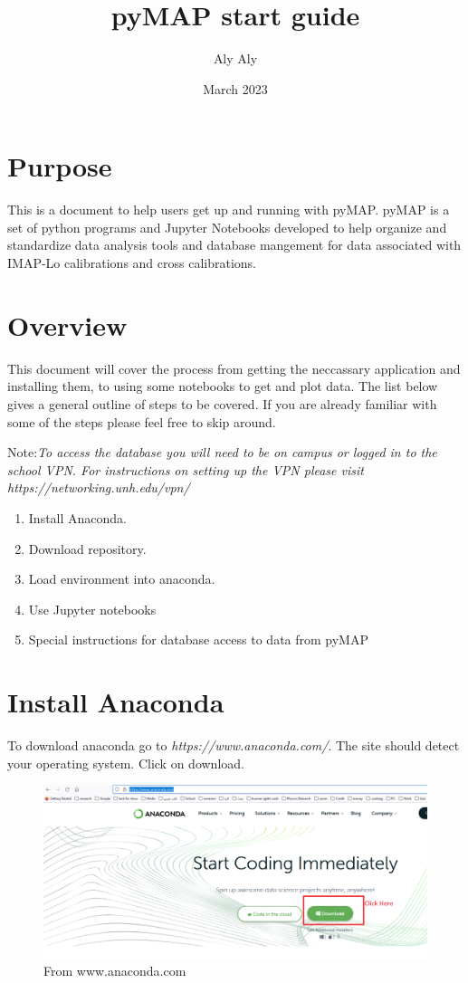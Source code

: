 \documentclass{article}
\title{pyMAP start guide}
\author{Aly Aly}
\date{March 2023}
\begin{document}
\maketitle

\section{Purpose}
This is a document to help users get up and running with pyMAP. pyMAP is a set of python programs and Jupyter Notebooks developed to help organize and standardize data analysis tools and database mangement for data associated with IMAP-Lo calibrations and cross calibrations.

\section{ Overview}

This document will cover the process from getting the neccassary application and installing them, to using some notebooks to get and plot data. The list below gives a general outline of steps to be covered. If you are already familiar with some of the steps please feel free to skip around.


Note:\textit{To access the database you will need to be on campus or logged in to the school VPN. For instructions on setting up the VPN please visit https://networking.unh.edu/vpn/}
\begin{enumerate}
    \item Install Anaconda.
    \item Download repository.
    \item Load environment into anaconda.
    \item Use Jupyter notebooks
    \item Special instructions for database access to data from pyMAP
\end{enumerate}

\section{Install Anaconda}
\label{sec:conda_inst}
To download anaconda go to \textit{https://www.anaconda.com/}. The site should detect your operating system. Click on download.
\begin{figure}[H]
\centering
\includegraphics[scale=0.4]{conda_DOWNLOAD.png}
\caption{From www.anaconda.com}
\label{fig:conda_download}
\end{figure}
\end{document}
